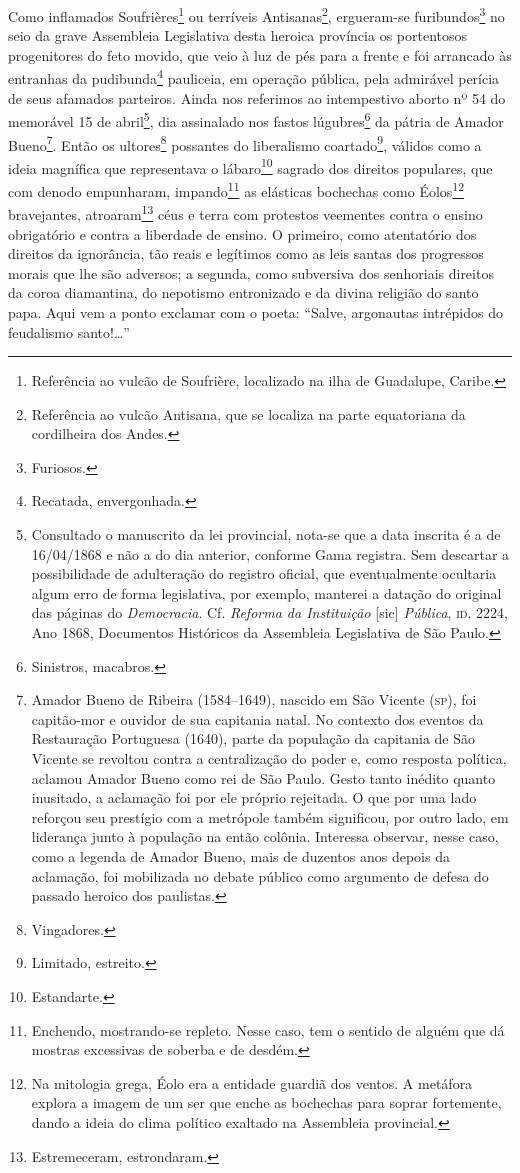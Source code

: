 Como inflamados Soufrières\footnote{Referência ao vulcão de Soufrière,
  localizado na ilha de Guadalupe, Caribe.} ou terríveis
Antisanas\footnote{Referência ao vulcão Antisana, que se localiza na
  parte equatoriana da cordilheira dos Andes.}, ergueram-se
furibundos\footnote{Furiosos.} no seio da grave Assembleia Legislativa
desta heroica província os portentosos progenitores do feto movido, que
veio à luz de pés para a frente e foi arrancado às entranhas da
pudibunda\footnote{Recatada, envergonhada.} pauliceia, em operação
pública, pela admirável perícia de seus afamados parteiros. Ainda nos
referimos ao intempestivo aborto nº 54 do memorável 15 de
abril\footnote{Consultado o manuscrito da lei provincial, nota-se que
  a data inscrita é a de 16/04/1868 e não a do dia anterior, conforme
  Gama registra. Sem descartar a possibilidade de adulteração do
  registro oficial, que eventualmente ocultaria algum erro de forma
  legislativa, por exemplo, manterei a datação do original das páginas
  do \emph{Democracia}. Cf. \emph{Reforma da Instituição} {[}sic{]}
  \emph{Pública}, \textsc{id}. 2224, Ano 1868, Documentos Históricos da
  Assembleia Legislativa de São Paulo.}, dia assinalado nos fastos
lúgubres\footnote{Sinistros, macabros.} da pátria de Amador
Bueno\footnote{Amador Bueno de Ribeira (1584--1649), nascido em São
  Vicente (\textsc{sp}), foi capitão-mor e ouvidor de sua capitania natal. No
  contexto dos eventos da Restauração Portuguesa (1640), parte da
  população da capitania de São Vicente se revoltou contra a
  centralização do poder e, como resposta política, aclamou Amador Bueno
  como rei de São Paulo. Gesto tanto inédito quanto inusitado, a
  aclamação foi por ele próprio rejeitada. O que por uma lado reforçou
  seu prestígio com a metrópole também significou, por outro lado, em
  liderança junto à população na então colônia. Interessa observar,
  nesse caso, como a legenda de Amador Bueno, mais de duzentos anos
  depois da aclamação, foi mobilizada no debate público como argumento
  de defesa do passado heroico dos paulistas.}. Então os
ultores\footnote{Vingadores.} possantes do liberalismo
coartado\footnote{Limitado, estreito.}, válidos como a ideia magnífica
que representava o lábaro\footnote{Estandarte.} sagrado dos direitos
populares, que com denodo empunharam, impando\footnote{Enchendo,
  mostrando-se repleto. Nesse caso, tem o sentido de alguém que dá
  mostras excessivas de soberba e de desdém.} as elásticas bochechas
como Éolos\footnote{Na mitologia grega, Éolo era a entidade guardiã
  dos ventos. A metáfora explora a imagem de um ser que enche as
  bochechas para soprar fortemente, dando a ideia do clima político
  exaltado na Assembleia provincial.} bravejantes, atroaram\footnote{
  Estremeceram, estrondaram.} céus e terra com protestos veementes
contra o ensino obrigatório e contra a liberdade de ensino. O primeiro,
como atentatório dos direitos da ignorância, tão reais e legítimos como
as leis santas dos progressos morais que lhe são adversos; a segunda,
como subversiva dos senhoriais direitos da coroa diamantina, do
nepotismo entronizado e da divina religião do santo papa. Aqui vem a
ponto exclamar com o poeta: ``Salve, argonautas intrépidos do feudalismo
santo!\ldots{}''

